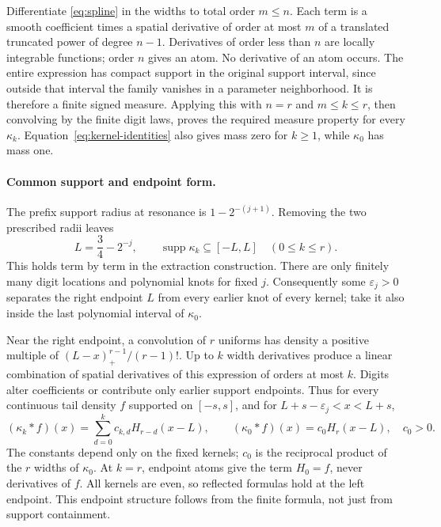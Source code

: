 \documentclass[11pt,letterpaper]{article}
\theoremstyle{remark}\newtheorem{remark}[theorem]{Remark}
\newcommand{\supp}{\operatorname{supp}}
\begin{document}
Differentiate \eqref{eq:spline} in the widths to total order $m\le n$. Each term is a smooth coefficient times a spatial derivative of order at most $m$ of a translated truncated power of degree $n-1$. Derivatives of order less than $n$ are locally integrable functions; order $n$ gives an atom. No derivative of an atom occurs. The entire expression has compact support in the original support interval, since outside that interval the family vanishes in a parameter neighborhood. It is therefore a finite signed measure. Applying this with $n=r$ and $m\le k\le r$, then convolving by the finite digit laws, proves the required measure property for every $\kappa_k$. Equation~\eqref{eq:kernel-identities} also gives mass zero for $k\ge1$, while $\kappa_0$ has mass one.

\paragraph{Common support and endpoint form.}
The prefix support radius at resonance is $1-2^{-(j+1)}$. Removing the two prescribed radii leaves
\[
L=\frac34-2^{-j},\qquad \supp\kappa_k\subseteq[-L,L]\quad(0\le k\le r).
\]
This holds term by term in the extraction construction. There are only finitely many digit locations and polynomial knots for fixed $j$. Consequently some $\varepsilon_j>0$ separates the right endpoint $L$ from every earlier knot of every kernel; take it also inside the last polynomial interval of $\kappa_0$.

Near the right endpoint, a convolution of $r$ uniforms has density a positive multiple of $(L-x)_+^{r-1}/(r-1)!$. Up to $k$ width derivatives produce a linear combination of spatial derivatives of this expression of orders at most $k$. Digits alter coefficients or contribute only earlier support endpoints. Thus for every continuous tail density $f$ supported on $[-s,s]$, and for $L+s-\varepsilon_j<x<L+s$,
\begin{equation}\label{eq:kernel-endpoints}
(\kappa_k*f)(x)=\sum_{d=0}^k c_{k,d}H_{r-d}(x-L),\qquad
(\kappa_0*f)(x)=c_0H_r(x-L),\quad c_0>0.
\end{equation}
The constants depend only on the fixed kernels; $c_0$ is the reciprocal product of the $r$ widths of $\kappa_0$. At $k=r$, endpoint atoms give the term $H_0=f$, never derivatives of $f$. All kernels are even, so reflected formulas hold at the left endpoint. This endpoint structure follows from the finite formula, not just from support containment.
\end{document}
